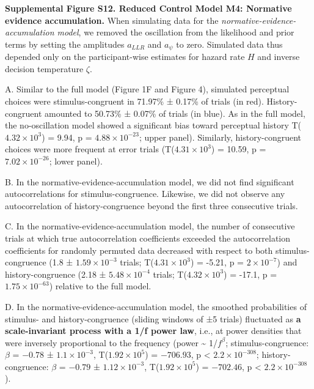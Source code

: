 \documentclass[
]{article}
\begin{document}
\textbf{Supplemental Figure S12. Reduced Control Model M4: Normative
evidence accumulation.} When simulating data for the
\emph{normative-evidence-accumulation model}, we removed the oscillation
from the likelihood and prior terms by setting the amplitudes
\(a_{LLR}\) and \(a_{\psi}\) to zero. Simulated data thus depended only
on the participant-wise estimates for hazard rate \(H\) and inverse
decision temperature \(\zeta\).

A. Similar to the full model (Figure 1F and Figure 4), simulated
perceptual choices were stimulus-congruent in 71.97\% ± 0.17\% of trials
(in red). History-congruent amounted to 50.73\% ± 0.07\% of trials (in
blue). As in the full model, the no-oscillation model showed a
significant bias toward perceptual history
T(\ensuremath{4.32\times 10^{3}}) = 9.94, p =
\(\ensuremath{4.88\times 10^{-23}}\); upper panel). Similarly,
history-congruent choices were more frequent at error trials
(T(\ensuremath{4.31\times 10^{3}}) = 10.59, p =
\(\ensuremath{7.02\times 10^{-26}}\); lower panel).

B. In the normative-evidence-accumulation model, we did not find
significant autocorrelations for stimulus-congruence. Likewise, we did
not observe any autocorrelation of history-congruence beyond the first
three consecutive trials.

C. In the normative-evidence-accumulation model, the number of
consecutive trials at which true autocorrelation coefficients exceeded
the autocorrelation coefficients for randomly permuted data decreased
with respect to both stimulus-congruence (1.8 ±
\ensuremath{1.59\times 10^{-3}} trials;
T(\ensuremath{4.31\times 10^{3}}) = -5.21, p =
\(\ensuremath{2\times 10^{-7}}\)) and history-congruence (2.18 ±
\ensuremath{5.48\times 10^{-4}} trials;
T(\ensuremath{4.32\times 10^{3}}) = -17.1, p =
\(\ensuremath{1.75\times 10^{-63}}\)) relative to the full model.

D. In the normative-evidence-accumulation model, the smoothed
probabilities of stimulus- and history-congruence (sliding windows of ±5
trials) fluctuated as \textbf{a scale-invariant process with a 1/f power
law}, i.e., at power densities that were inversely proportional to the
frequency (power \textasciitilde{} 1/\(f^\beta\); stimulus-congruence:
\(\beta\) = \(-0.78\) ± \(\ensuremath{1.1\times 10^{-3}}\),
T(\(\ensuremath{1.92\times 10^{5}}\)) = \(-706.93\), p < \(\ensuremath{2.2\times 10^{-308}}\);
history-congruence: \(\beta\) = \(-0.79\) ±
\(\ensuremath{1.12\times 10^{-3}}\),
T(\(\ensuremath{1.92\times 10^{5}}\)) = \(-702.46\), p < \(\ensuremath{2.2\times 10^{-308}}\)).
\end{document}

